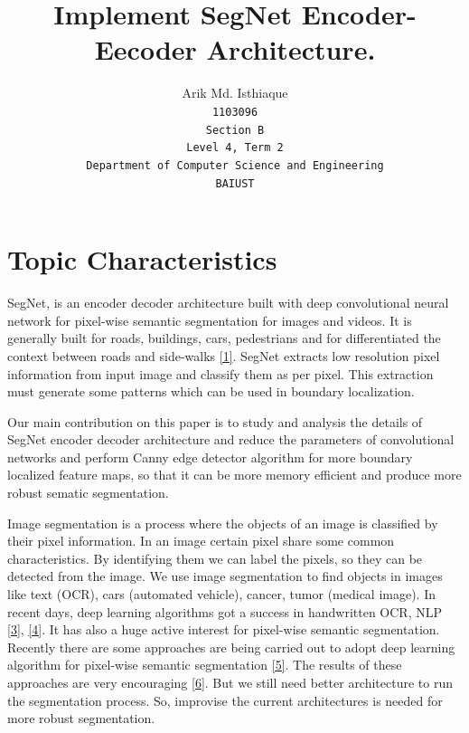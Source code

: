 \documentclass[a4paper,12pt]{article}
\begin{document}
\title{Implement SegNet Encoder-Eecoder Architecture.}

\author{
  Arik Md. Isthiaque\\
  \texttt{1103096}\\
  \texttt{Section B}\\
  \texttt{Level 4, Term 2}\\
  \texttt{Department of Computer Science and Engineering}\\
  \texttt{BAIUST}
}

\maketitle

\section{Topic Characteristics}
SegNet, is an encoder decoder architecture built with deep convolutional neural network for pixel-wise semantic segmentation for images and videos. It is generally built for roads, buildings, cars, pedestrians and for differentiated the context between roads and side-walks \hyperlink{1}{[1]}. SegNet extracts low resolution pixel information from input image and classify them as per pixel. This extraction must generate some patterns which can be used in boundary localization.

Our main contribution on this paper is to study and analysis the details of SegNet encoder decoder architecture and reduce the parameters of convolutional networks and perform Canny edge detector algorithm for more boundary localized feature maps, so that it can be more memory efficient and produce more robust sematic segmentation.  

Image segmentation is a process where the objects of an image is classified by their pixel information. In an image certain pixel share some common characteristics. By identifying them we can label the pixels, so they can be detected from the image. We use image segmentation to find objects in images like text (OCR), cars (automated vehicle), cancer, tumor (medical image). In recent days, deep learning algorithms got a success in handwritten OCR, NLP  \hyperlink{3}{[3]},  \hyperlink{4}{[4]}. It has also a huge active interest for pixel-wise semantic segmentation. Recently there are some approaches are being carried out to adopt deep learning algorithm for pixel-wise semantic segmentation  \hyperlink{5}{[5]}. The results of these approaches are very encouraging  \hyperlink{6}{[6]}. But we still need better architecture to run the segmentation process. So, improvise the current architectures is needed for more robust segmentation.
\end{document}
